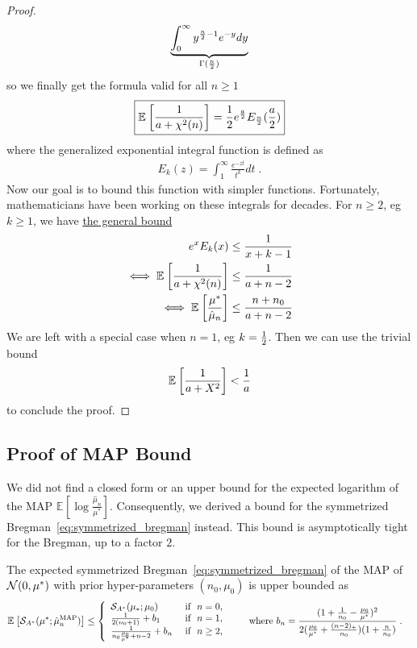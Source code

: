 \documentclass[twoside]{article}
\newcommand*{\expect}[2][]{\ensuremath{\mathbb{E}_{#1} \left[ #2 \right] }} %
\newcommand{\logpart}{A}
\newcommand{\conj}{{\logpart^*}}
\newcommand{\m}{\mu}
\newcommand{\MAPm}{\hat \m_n}
\begin{document}
\begin{proof}
\begin{align}
		\underbrace{\int_0^\infty  y^{\frac{n}{2}-1} e^{-y} dy}_{\Gamma(\half[n])}
	\end{align}
	so we finally get  the formula valid for all $n\geq 1$
	\begin{align}
		\boxed{\expect{\inv{a + \chi^2(n)}}  = \half e^{\frac{a}{2}} E_{\half[n]}(\half[a])}
		\label{eq:hard_expectation}
	\end{align}
	where the {generalized exponential integral function} is defined as 
	\begin{align}
		E_k(z) = \int_1^\infty \frac{e^{-z t} }{t^k} dt \; .
	\end{align}
	Now our goal is to bound this function with simpler functions.
	Fortunately, mathematicians have been working on these integrals for decades.
	For $n \geq 2$, eg $k\geq 1$, we have \href{https://dlmf.nist.gov/8.19.E21}{the general bound} \citep[Eq.~8.19.21]{DLMF}
	\begin{align}
		e^x E_k(x) 
		&\leq \inv{x + k - 1} \\
		\iff \expect{\inv{a + \chi^2(n)}}
		&\leq \inv{a + n - 2} \\
		\iff \expect{\frac{\mu^*}{\MAPm}} 
		&\leq \frac{n +n_0}{a + n - 2}
	\end{align}
We are left with a special case when  $n=1$, eg $k=\half$. 
Then we can use the trivial bound 
\begin{align}
	\expect{\inv{a + X^2}} < \inv{a}
	\label{eq:trivial_bound}
\end{align}
to conclude the proof.
\end{proof}



\subsection{Proof of MAP Bound}

We did not find a closed form or an upper bound for the expected logarithm of the MAP $\expect{\log\frac{\MAPm}{\mu^*}}$.
Consequently, we derived a bound for the symmetrized Bregman~\eqref{eq:symmetrized_bregman} instead. 
This bound is asymptotically tight for the Bregman, up to a factor $2$.

\begin{theorem}
The expected symmetrized Bregman~\eqref{eq:symmetrized_bregman} of the MAP of $\cN(0,\m^*)$ with prior hyper-parameters $(n_0,\m_0)$ is upper bounded as
 \begin{align}
	& \expect{\cS_\conj( \m^*; \hat \m_n^\mathrm{MAP})}
	\leq 
	\left\{\begin{array}{ll}
		\cS_\conj( \mu_*; \mu_0) 					& \text{ if } \ n=0, \\
		\inv{2(n_0+1)}  +  b_1 						& \text{ if }\ n=1,\\
		\frac{1}{n_0 \frac{\m_0}{\m^*} +n-2} + b_n  & \text{ if }\ n\geq 2,
	\end{array}\right.
	\quad 
	\quad 
	\text{where }
	b_n = \frac{(1 + \inv{n_0} - \frac{\m_0}{\m^*})^2}{2 (\frac{\m_0}{\m^*}+\frac{(n-2)_+}{n_0})(1 + \frac{n}{n_0} )} \; . 
\end{align}
\end{theorem} 
\end{document}
